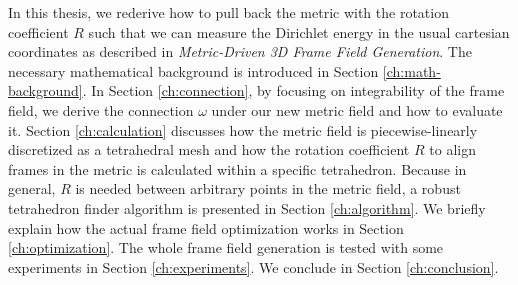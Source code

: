 \documentclass[../thesis.tex]{subfiles}
\begin{document}
In this thesis, we rederive how to pull back the metric with the rotation coefficient $R$ such that we can measure
the Dirichlet energy in the usual cartesian coordinates as described in \emph{Metric-Driven 3D Frame Field Generation}\cite{Fang23}.
The necessary mathematical background is introduced in Section \ref{ch:math-background}.
In Section \ref{ch:connection}, by focusing on integrability of the frame field,
we derive the connection $\omega$ under our new metric field and how to evaluate it.
Section \ref{ch:calculation} discusses how the metric field is piecewise-linearly discretized as a tetrahedral
mesh and how the rotation coefficient $R$ to align frames in the metric is calculated within a specific tetrahedron.
Because in general, $R$ is needed between arbitrary points in the metric field, a robust tetrahedron finder algorithm is
presented in Section \ref{ch:algorithm}.
We briefly explain how the actual frame field optimization works in Section \ref{ch:optimization}.
The whole frame field generation is tested with some experiments in Section \ref{ch:experiments}.
We conclude in Section \ref{ch:conclusion}.
\end{document}
